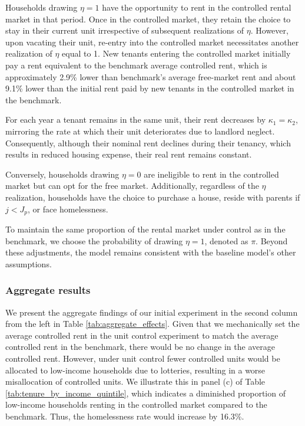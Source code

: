 \documentclass[parskip=full]{article}
\begin{document}
Households drawing $\eta = 1$ have the opportunity to rent in the controlled rental market in that period. Once in the controlled market, they retain the choice to stay in their current unit irrespective of subsequent realizations of $\eta$. However, upon vacating their unit, re-entry into the controlled market necessitates another realization of $\eta$ equal to 1. New tenants entering the controlled market initially pay a rent equivalent to the benchmark average controlled rent, which is approximately 2.9\% lower than benchmark's average free-market rent and about 9.1\% lower than the initial rent paid by new tenants in the controlled market in the benchmark.

For each year a tenant remains in the same unit, their rent decreases by $\kappa_{1}=\kappa_{2}$, mirroring the rate at which their unit deteriorates due to landlord neglect. Consequently, although their nominal rent declines during their tenancy, which results in reduced housing expense, their real rent remains constant.

Conversely, households drawing $\eta = 0$ are ineligible to rent in the controlled market but can opt for the free market. Additionally, regardless of the $\eta$ realization, households have the choice to purchase a house, reside with parents if $j<J_{p}$, or face homelessness.

To maintain the same proportion of the rental market under control as in the benchmark, we choose the probability of drawing $\eta = 1$, denoted as $\pi$. Beyond these adjustments, the model remains consistent with the baseline model's other assumptions.

\subsubsection{Aggregate results}

We present the aggregate findings of our initial experiment in the second column from the left in Table \ref{tab:aggregate_effects}. Given that we mechanically set the average controlled rent in the unit control experiment to match the average controlled rent in the benchmark, there would be no change in the average controlled rent. However, under unit control fewer controlled units would be allocated to low-income households due to lotteries, resulting in a worse misallocation of controlled units. We illustrate this in panel (c) of Table \ref{tab:tenure_by_income_quintile}, which indicates a diminished proportion of low-income households renting in the controlled market compared to the benchmark. Thus, the homelessness rate would increase by 16.3\%.
\end{document}
